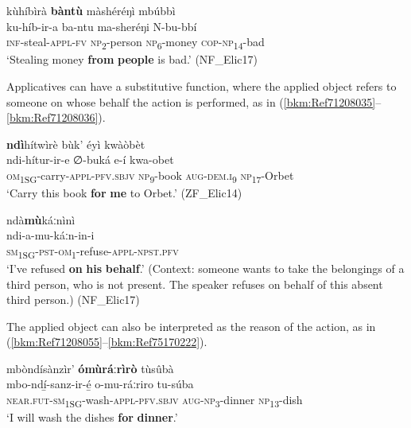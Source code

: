 \ea
\label{bkm:Ref445887391}
kùhíbìrà \textbf{bàntù} màshéréŋì mbúbbì\\
\gll ku-híb-ir-a    ba-ntu  ma-sheréŋi  N-bu-bbí\\
\textsc{inf}-steal-\textsc{appl}-\textsc{fv}  \textsc{np}\textsubscript{2}-person  \textsc{np}\textsubscript{6}-money  \textsc{cop}-\textsc{np}\textsubscript{14}-bad\\
\glt ‘Stealing money \textbf{from} \textbf{people} is bad.’ (NF\_Elic17)
\z

Applicatives can have a substitutive function, where the applied object refers to someone on whose behalf the action is performed, as in (\ref{bkm:Ref71208035}--\ref{bkm:Ref71208036}).

\ea
\label{bkm:Ref71208035}
\textbf{ndì}hítwìrè bùk’ éyì kwàòbèt\\
\gll ndi-hítur-ir-e      ∅-buká  e-í    kwa-obet\\
\textsc{om}\textsubscript{1SG}-carry-\textsc{appl}-\textsc{pfv}.\textsc{sbjv}  \textsc{np}\textsubscript{9}-book  \textsc{aug}-\textsc{dem}.\textsc{i}\textsubscript{9}  \textsc{np}\textsubscript{17}-Orbet\\
\glt ‘Carry this book \textbf{for} \textbf{me} to Orbet.’ (ZF\_Elic14)
\z

\ea
\label{bkm:Ref71208036}
\glll ndà\textbf{mù}káːnìnì\\
ndi-a-mu-káːn-in-i\\
\textsc{sm}\textsubscript{1SG}-\textsc{pst}-\textsc{om}\textsubscript{1}-refuse-\textsc{appl}-\textsc{npst}.\textsc{pfv}\\
\glt ‘I’ve refused \textbf{on} \textbf{his} \textbf{behalf}.’ (Context: someone wants to take the belongings of a third person, who is not present. The speaker refuses on behalf of this absent third person.) (NF\_Elic17)
\z

The applied object can also be interpreted as the reason of the action, as in (\ref{bkm:Ref71208055}--\ref{bkm:Ref75170222}).

\ea
\label{bkm:Ref71208055}
mbòndísànzìr’ \textbf{ómùráːrìrò} tùsûbà\\
\gll mbo-ndí̲-sanz-ir-é̲        o-mu-ráːriro    tu-súba\\
\textsc{near}.\textsc{fut}-\textsc{sm}\textsubscript{1SG}-wash-\textsc{appl}-\textsc{pfv}.\textsc{sbjv}  \textsc{aug}-\textsc{np}\textsubscript{3}-dinner  \textsc{np}\textsubscript{13}-dish\\
\glt ‘I will wash the dishes \textbf{for} \textbf{dinner}.’
\z

